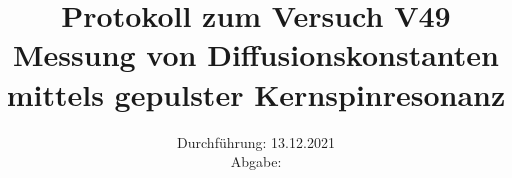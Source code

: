 \titlehead{\texttt{[image: ressources/logo.jpg]}}
\title{Protokoll zum Versuch V49 \\ Messung von Diffusionskonstanten mittels gepulster Kernspinresonanz }
\date{Durchführung: 13.12.2021 \\ Abgabe:  }

